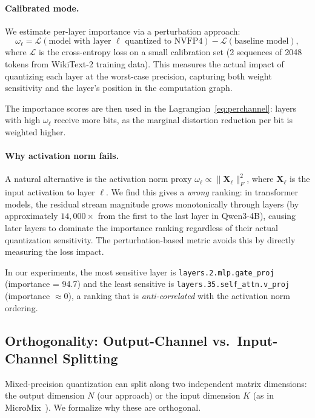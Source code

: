 \documentclass{article}
\begin{document}
\paragraph{Calibrated mode.}
We estimate per-layer importance via a perturbation approach:
\begin{equation}
\omega_\ell = \mathcal{L}\!\left(\text{model with layer } \ell \text{ quantized to NVFP4}\right) - \mathcal{L}\!\left(\text{baseline model}\right),
\end{equation}
where $\mathcal{L}$ is the cross-entropy loss on a small calibration set (2 sequences of 2048 tokens from WikiText-2 training data).
This measures the actual impact of quantizing each layer at the worst-case precision, capturing both weight sensitivity and the layer's position in the computation graph.

The importance scores are then used in the Lagrangian~\eqref{eq:perchannel}: layers with high $\omega_\ell$ receive more bits, as the marginal distortion reduction per bit is weighted higher.

\paragraph{Why activation norm fails.}
A natural alternative is the activation norm proxy $\omega_\ell \propto \|\mathbf{X}_\ell\|_F^2$, where $\mathbf{X}_\ell$ is the input activation to layer $\ell$.
We find this gives a \emph{wrong} ranking: in transformer models, the residual stream magnitude grows monotonically through layers (by approximately $14{,}000\times$ from the first to the last layer in Qwen3-4B), causing later layers to dominate the importance ranking regardless of their actual quantization sensitivity.
The perturbation-based metric avoids this by directly measuring the loss impact.

In our experiments, the most sensitive layer is \texttt{layers.2.mlp.gate\_proj} (importance = 94.7) and the least sensitive is \texttt{layers.35.self\_attn.v\_proj} (importance $\approx 0$), a ranking that is \emph{anti-correlated} with the activation norm ordering.

\subsection{Orthogonality: Output-Channel vs.\ Input-Channel Splitting}
\label{sec:orthogonality}

Mixed-precision quantization can split along two independent matrix dimensions: the output dimension $N$ (our approach) or the input dimension $K$ (as in MicroMix~\cite{yi2024micromix}).
We formalize why these are orthogonal.
\end{document}
